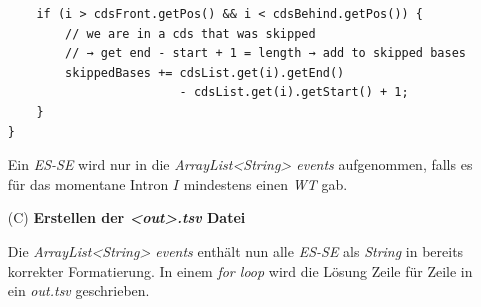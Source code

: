 \documentclass[12pt]{article}
\begin{document}
\begin{enumerate}
\begin{verbatim}
    if (i > cdsFront.getPos() && i < cdsBehind.getPos()) {
        // we are in a cds that was skipped
        // → get end - start + 1 = length → add to skipped bases
        skippedBases += cdsList.get(i).getEnd() 
                        - cdsList.get(i).getStart() + 1;
    }
}
    \end{verbatim}
		Ein \textit{ES-SE} wird nur in die \textit{ArrayList<String> events} aufgenommen, falls es für das momentane
		Intron $I$ mindestens einen \textit{WT} gab.

	\item[(C)] \textbf{Erstellen der \textit{<out>.tsv} Datei}

		Die \textit{ArrayList<String> events} enthält nun alle \textit{ES-SE} als \textit{String} in bereits
		korrekter Formatierung. In einem \textit{for loop} wird die Lösung Zeile für Zeile in ein \textit{out.tsv}
		geschrieben.
\end{enumerate}
\newpage
\end{document}

